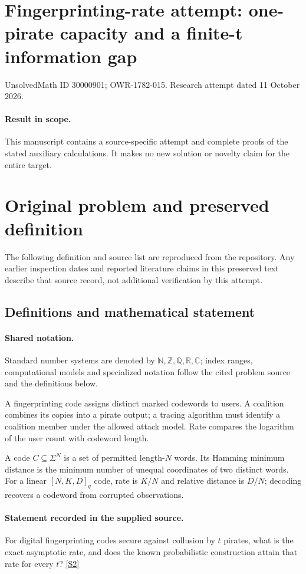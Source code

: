 \documentclass[11pt]{article}
\begin{document}
\section*{Fingerprinting-rate attempt: one-pirate capacity and a finite-t information gap}
\noindent UnsolvedMath ID 30000901; OWR-1782-015. Research attempt dated 11 October 2026.
\paragraph{Result in scope.}This manuscript contains a source-specific attempt and complete proofs of the stated auxiliary calculations. It makes no new solution or novelty claim for the entire target.
\section{Original problem and preserved definition}
The following definition and source list are reproduced from the repository. Any earlier inspection dates and reported literature claims in this preserved text describe that source record, not additional verification by this attempt.
\subsection{Definitions and mathematical statement}

\paragraph{Shared notation.}Standard number systems are denoted by $\mathbb N,\mathbb Z,\mathbb Q,\mathbb R,\mathbb C$; index ranges, computational models and specialized notation follow the cited problem source and the definitions below.


A fingerprinting code assigns distinct marked codewords to users. A coalition combines its copies into a pirate output; a tracing algorithm must identify a coalition member under the allowed attack model. Rate compares the logarithm of the user count with codeword length.

A code $C\subseteq\Sigma^N$ is a set of permitted length-$N$ words. Its Hamming minimum distance is the minimum number of unequal coordinates of two distinct words. For a linear $[N,K,D]_q$ code, rate is $K/N$ and relative distance is $D/N$; decoding recovers a codeword from corrupted observations.
\paragraph{Statement recorded in the supplied source.}
For digital fingerprinting codes secure against collusion by $t$ pirates, what is the exact asymptotic rate, and does the known probabilistic construction attain that rate for every $t$? \href{https://doi.org/10.4171/owr/2008/01}{[S2]}
\end{document}
